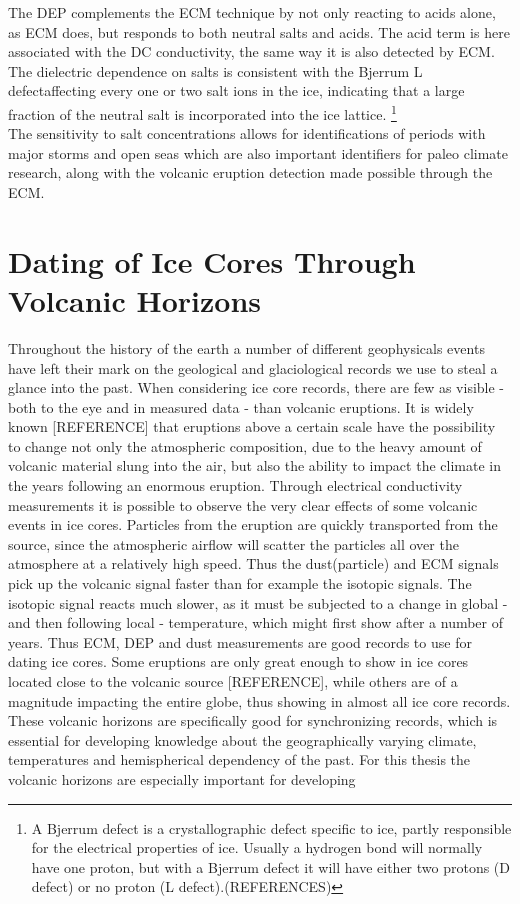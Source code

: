 \documentclass[../../CompleteThesis/Complete_1stDraft.tex]{subfiles}
\begin{document}
The DEP complements the ECM technique by not only reacting to acids alone, as ECM does, but responds to both neutral salts and acids.
The acid term is here associated with the DC conductivity, the same way it is also detected by ECM. The dielectric dependence on salts is consistent with the Bjerrum L defect\footnotemark affecting every one or two salt ions in the ice, indicating that a large fraction of the neutral salt is incorporated into the ice lattice.
\footnote[3]{A Bjerrum defect is a crystallographic defect specific to ice, partly responsible for the electrical properties of ice. Usually a hydrogen bond will normally have one proton, but with a Bjerrum defect it will have either two protons (D defect) or no proton (L defect).(REFERENCES)}\\
The sensitivity to salt concentrations allows for identifications of periods with major storms and open seas which are also important identifiers for paleo climate research, along with the volcanic eruption detection made possible through the ECM.



\section[Volcanic Horizons][Volcanic Horizons]{Dating of Ice Cores Through Volcanic Horizons}
\label{Sec:Ice_VolcanicHorizons}
Throughout the history of the earth a number of different geophysicals events have left their mark on the geological and glaciological records we use to steal a glance into the past. When considering ice core records, there are few as visible - both to the eye and in measured data - than volcanic eruptions. It is widely known [REFERENCE] that eruptions above a certain scale have the possibility to change not only the atmospheric composition, due to the heavy amount of volcanic material slung into the air, but also the ability to impact the climate in the years following an enormous eruption. 
Through electrical conductivity measurements it is possible to observe the very clear effects of some volcanic events in ice cores. Particles from the eruption are quickly transported from the source, since the atmospheric airflow will scatter the particles all over the atmosphere at a relatively high speed. Thus the dust(particle) and ECM signals pick up the volcanic signal faster than for example the isotopic signals. The isotopic signal reacts much slower, as it must be subjected to a change in global - and then following local - temperature, which might first show after a number of years. Thus ECM, DEP and dust measurements are good records to use for dating ice cores. Some eruptions are only great enough to show in ice cores located close to the volcanic source [REFERENCE], while others are of a magnitude impacting the entire globe, thus showing in almost all ice core records. These volcanic horizons are specifically good for synchronizing records, which is essential for developing knowledge about the geographically varying climate, temperatures and hemispherical dependency of the past. 
For this thesis the volcanic horizons are especially important for developing
\end{document}
